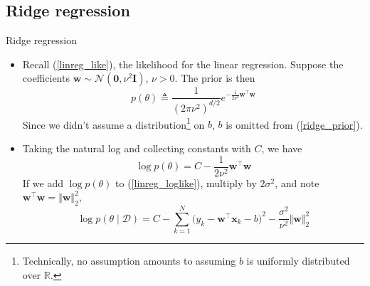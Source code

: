 \documentclass{beamer}
\numberwithin{equation}{section}
\newcommand{\aref}[1]{\alert{\ref{#1}}}
\begin{document}
\subsection{Ridge regression}

\begin{frame}{Ridge regression}
    \begin{itemize}
        \item
        Recall (\aref{linreg_like}), the likelihood for the linear regression.
        Suppose the coefficients $ \mathbf{w} \sim \mathcal{N}(\mathbf{0},
        \nu^2\mathbf{I}) $, $ \nu > 0 $. The prior is then
        \begin{equation} \label{ridge_prior}
            p(\theta) \triangleq \frac{1}{(2\pi\nu^2)^{d / 2}}
            e^{-\frac{1}{2\nu^2}\mathbf{w}^\top\mathbf{w}}
        \end{equation}
        Since we didn't assume a distribution\footnote{
            Technically, no assumption amounts to assuming $ b $ is
            uniformly distributed over $ \mathbb{R} $.
        } on $ b $, $ b $ is omitted from
        (\aref{ridge_prior}).

        \item
        Taking the natural log and collecting constants with $ C $, we have
        \begin{equation*}
            \log p(\theta) = C - \frac{1}{2\nu^2}\mathbf{w}^\top\mathbf{w}
        \end{equation*}
        If we add $ \log p(\theta) $ to (\aref{linreg_loglike}), multiply
        by $ 2\sigma^2 $, and note $ \mathbf{w}^\top\mathbf{w} =
        \Vert\mathbf{w}\Vert_2^2 $,
        \begin{equation*}
            \log p(\theta \mid \mathcal{D}) = C - \sum_{k = 1}^N
            \big(y_k - \mathbf{w}^\top\mathbf{x}_k - b\big)^2 -
            \frac{\sigma^2}{\nu^2}\Vert\mathbf{w}\Vert_2^2
        \end{equation*}
    \end{itemize}
\end{frame}
\end{document}
